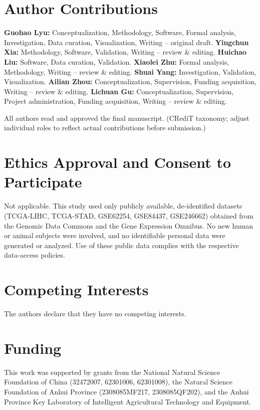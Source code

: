 \documentclass[modern,large,numbered,nocrop]{oup-authoring-template}
\begin{document}
\section*{Author Contributions}

\textbf{Guohao Lyu:} Conceptualization, Methodology, Software, Formal analysis, Investigation, Data curation, Visualization, Writing -- original draft. \textbf{Yingchun Xia:} Methodology, Software, Validation, Writing -- review \& editing. \textbf{Huichao Liu:} Software, Data curation, Validation. \textbf{Xiaolei Zhu:} Formal analysis, Methodology, Writing -- review \& editing. \textbf{Shuai Yang:} Investigation, Validation, Visualization. \textbf{Ailian Zhou:} Conceptualization, Supervision, Funding acquisition, Writing -- review \& editing. \textbf{Lichuan Gu:} Conceptualization, Supervision, Project administration, Funding acquisition, Writing -- review \& editing.

All authors read and approved the final manuscript. (CRediT taxonomy; adjust individual roles to reflect actual contributions before submission.)

\section*{Ethics Approval and Consent to Participate}

Not applicable. This study used only publicly available, de-identified datasets (TCGA-LIHC, TCGA-STAD, GSE62254, GSE84437, GSE246662) obtained from the Genomic Data Commons and the Gene Expression Omnibus. No new human or animal subjects were involved, and no identifiable personal data were generated or analyzed. Use of these public data complies with the respective data-access policies.

\section*{Competing Interests}

The authors declare that they have no competing interests.

\section*{Funding}

This work was supported by grants from the National Natural Science Foundation of China (32472007, 62301006, 62301008), the Natural Science Foundation of Anhui Province (2308085MF217, 2308085QF202), and the Anhui Province Key Laboratory of Intelligent Agricultural Technology and Equipment.
\end{document}
